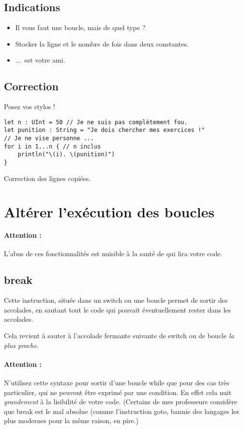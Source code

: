 \subsection{Indications}
\begin{itemize}
\item Il vous faut une boucle, mais de quel type ?

\item Stocker la ligne et le nombre de fois dans deux constantes.

\item ...\ est votre ami.
\end{itemize}
\pagebreak %
\subsection{Correction}
Posez vos stylos !
\begin{listing}[h]
\begin{verbatim}
let n : UInt = 50 // Je ne suis pas complètement fou.
let punition : String = "Je dois chercher mes exercices !"
// Je ne vise personne ...
for i in 1...n { // n inclus
    println("\(i). \(punition)")
}
\end{verbatim}
\caption{Correction des lignes copiées.}
\end{listing}%
\section{Altérer l'exécution des boucles}
\paragraph{Attention :}
L'abus de ces fonctionnalités est nuisible à la santé de qui lira votre code.

\subsection{break}
Cette instruction, située dans un switch ou une boucle permet de sortir des accolades, en sautant tout le code qui pouvait éventuellement rester dans les accolades.

Cela revient à sauter à l'accolade fermante suivante de switch ou de boucle \emph{la plus proche}.
\paragraph{Attention :}N'utilisez cette syntaxe pour sortir d'une boucle while que pour des cas très particulier, qui ne peuvent être exprimé par une condition. En effet cela nuit \emph{grandement} à la lisibilité de votre code. (Certains de mes professeurs considère que break est le mal absolue (comme l'instruction goto, bannie des langages les plus modernes pour la même raison, en pire.)
